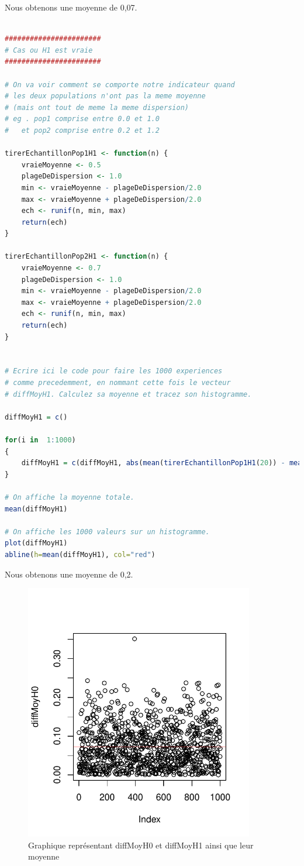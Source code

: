Nous obtenons une moyenne de 0,07.
\newpage
\begin{lstlisting}[language=R]

#######################
# Cas ou H1 est vraie 
####################### 

# On va voir comment se comporte notre indicateur quand 
# les deux populations n'ont pas la meme moyenne
# (mais ont tout de meme la meme dispersion)
# eg . pop1 comprise entre 0.0 et 1.0
#   et pop2 comprise entre 0.2 et 1.2 

tirerEchantillonPop1H1 <- function(n) {
	vraieMoyenne <- 0.5
	plageDeDispersion <- 1.0
	min <- vraieMoyenne - plageDeDispersion/2.0
	max <- vraieMoyenne + plageDeDispersion/2.0
	ech <- runif(n, min, max)
	return(ech)
}

tirerEchantillonPop2H1 <- function(n) {
	vraieMoyenne <- 0.7
	plageDeDispersion <- 1.0
	min <- vraieMoyenne - plageDeDispersion/2.0
	max <- vraieMoyenne + plageDeDispersion/2.0
	ech <- runif(n, min, max)
	return(ech)
}


# Ecrire ici le code pour faire les 1000 experiences 
# comme precedemment, en nommant cette fois le vecteur
# diffMoyH1. Calculez sa moyenne et tracez son histogramme.

diffMoyH1 = c()

for(i in  1:1000)
{
	diffMoyH1 = c(diffMoyH1, abs(mean(tirerEchantillonPop1H1(20)) - mean(tirerEchantillonPop2H1(20))))
}

# On affiche la moyenne totale.
mean(diffMoyH1)

# On affiche les 1000 valeurs sur un histogramme.
plot(diffMoyH1)
abline(h=mean(diffMoyH1), col="red")

\end{lstlisting}

Nous obtenons une moyenne de 0,2.

\begin{figure}[H]
	\begin{center}
		\includegraphics[width=10cm]{diagrams/diffMoy.pdf}
		\caption{Graphique représentant diffMoyH0 et diffMoyH1 ainsi que leur moyenne}
		\label{fig:diffMoy}
	\end{center}
\end{figure}


